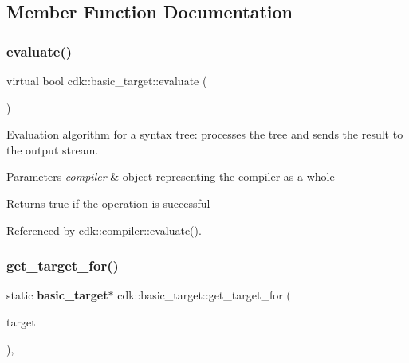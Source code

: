 \subsection{Member Function Documentation}
\mbox{\label{classcdk_1_1basic__target_a0db773c9c4f84a36df0949187aab9adb}} 
\subsubsection{evaluate()}
{\footnotesize\ttfamily virtual bool cdk\+::basic\+\_\+target\+::evaluate (\begin{DoxyParamCaption}\item[{std\+::shared\+\_\+ptr$<$ \textbf{ compiler} $>$}]{ }\end{DoxyParamCaption})\hspace{0.3cm}{\ttfamily [pure virtual]}}

Evaluation algorithm for a syntax tree\+: processes the tree and sends the result to the output stream. 
\begin{DoxyParams}{Parameters}
{\em compiler} & object representing the compiler as a whole \\
\hline
\end{DoxyParams}
\begin{DoxyReturn}{Returns}
true if the operation is successful 
\end{DoxyReturn}


Referenced by cdk\+::compiler\+::evaluate().

\mbox{\label{classcdk_1_1basic__target_a50126c8601a5b82dcce46e43d4258064}} 
\subsubsection{get\+\_\+target\+\_\+for()}
{\footnotesize\ttfamily static \textbf{ basic\+\_\+target}$\ast$ cdk\+::basic\+\_\+target\+::get\+\_\+target\+\_\+for (\begin{DoxyParamCaption}\item[{const std\+::string \&}]{target }\end{DoxyParamCaption})\hspace{0.3cm}{\ttfamily [inline]}, {\ttfamily [static]}}

